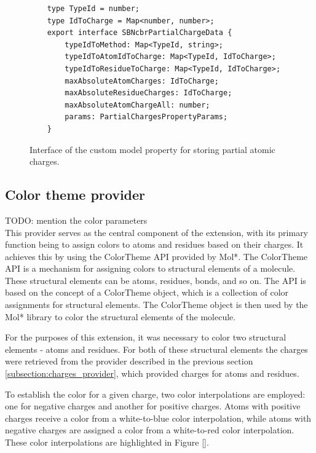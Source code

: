 \documentclass[
  digital,     %
  oneside,     %
  nosansbold,  %
  nocolorbold, %
  lof,         %
  lot,         %
]{fithesis4}
\begin{document}
\begin{figure}[htbp]
  \caption{Interface of the custom model property for storing partial atomic charges.}
  \label{fig:custom_model_property}
  \begin{verbatim}
    type TypeId = number;
    type IdToCharge = Map<number, number>;
    export interface SBNcbrPartialChargeData {
        typeIdToMethod: Map<TypeId, string>;
        typeIdToAtomIdToCharge: Map<TypeId, IdToCharge>;
        typeIdToResidueToCharge: Map<TypeId, IdToCharge>;
        maxAbsoluteAtomCharges: IdToCharge;
        maxAbsoluteResidueCharges: IdToCharge;
        maxAbsoluteAtomChargeAll: number;
        params: PartialChargesPropertyParams;
    }
  \end{verbatim}
\end{figure}

\subsection{Color theme provider}
\label{subsection:color_theme_provider}

TODO: mention the color parameters \\

This provider serves as the central component of the extension, with its primary function being to assign colors to atoms and residues based on their charges. It achieves this by using the ColorTheme API provided by Mol*. The ColorTheme API is a mechanism for assigning colors to structural elements of a molecule. These structural elements can be atoms, residues, bonds, and so on. The API is based on the concept of a ColorTheme object, which is a collection of color assignments for structural elements. The ColorTheme object is then used by the Mol* library to color the structural elements of the molecule.

For the purposes of this extension, it was necessary to color two structural elements - atoms and residues. For both of these structural elements the charges were retrieved from the provider described in the previous section \ref{subsection:charges_provider}, which provided charges for atoms and residues.

To establish the color for a given charge, two color interpolations are employed: one for negative charges and another for positive charges. Atoms with positive charges receive a color from a white-to-blue color interpolation, while atoms with negative charges are assigned a color from a white-to-red color interpolation. These color interpolations are highlighted in Figure \ref{}. 
\end{document}
